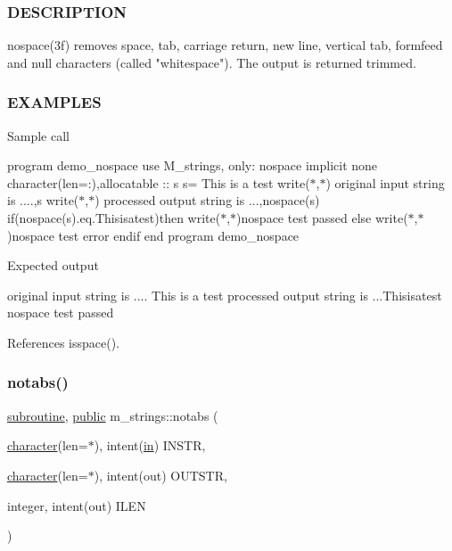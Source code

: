 \subsubsection*{D\+E\+S\+C\+R\+I\+P\+T\+I\+ON}

\begin{DoxyVerb}nospace(3f) removes space, tab, carriage return, new line, vertical
tab, formfeed and null characters (called "whitespace"). The output
is returned trimmed.
\end{DoxyVerb}


\subsubsection*{E\+X\+A\+M\+P\+L\+ES}

Sample call

program demo\+\_\+nospace use M\+\_\+strings, only\+: nospace implicit none character(len=\+:),allocatable \+:\+: s s=\textquotesingle{} This is a test \textquotesingle{} write($\ast$,$\ast$) \textquotesingle{}original input string is ....\textquotesingle{},s write($\ast$,$\ast$) \textquotesingle{}processed output string is ...\textquotesingle{},nospace(s) if(nospace(s).eq.\textquotesingle{}Thisisatest\textquotesingle{})then write($\ast$,$\ast$)\textquotesingle{}nospace test passed\textquotesingle{} else write($\ast$,$\ast$)\textquotesingle{}nospace test error\textquotesingle{} endif end program demo\+\_\+nospace

Expected output

original input string is .... This is a test processed output string is ...Thisisatest nospace test passed 

References isspace().

\mbox{\label{namespacem__strings_a3bf44ac06a670f55830e17a6f1108b9c}} 
\subsubsection{\texorpdfstring{notabs()}{notabs()}}
{\footnotesize\ttfamily \hyperlink{M__stopwatch_83_8txt_acfbcff50169d691ff02d4a123ed70482}{subroutine}, \hyperlink{M__stopwatch_83_8txt_a2f74811300c361e53b430611a7d1769f}{public} m\+\_\+strings\+::notabs (\begin{DoxyParamCaption}\item[{\hyperlink{option__stopwatch_83_8txt_abd4b21fbbd175834027b5224bfe97e66}{character}(len=$\ast$), intent(\hyperlink{M__journal_83_8txt_afce72651d1eed785a2132bee863b2f38}{in})}]{I\+N\+S\+TR,  }\item[{\hyperlink{option__stopwatch_83_8txt_abd4b21fbbd175834027b5224bfe97e66}{character}(len=$\ast$), intent(out)}]{O\+U\+T\+S\+TR,  }\item[{integer, intent(out)}]{I\+L\+EN }\end{DoxyParamCaption})}



